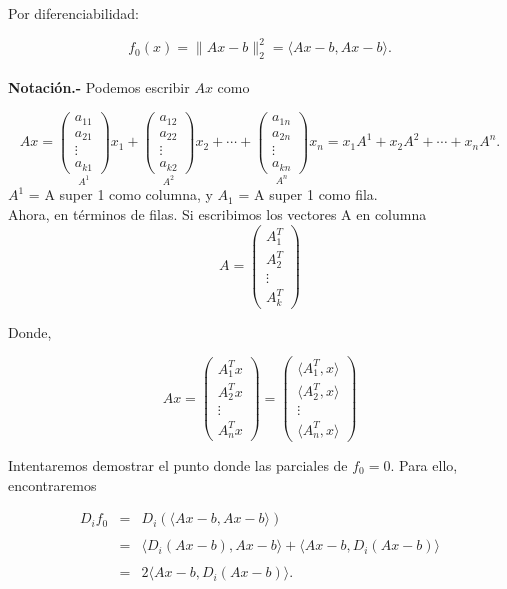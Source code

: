 \begin{ejem}
Por diferenciabilidad:

$$f_0(x)=\|Ax-b\|_2^2 = \langle Ax-b,Ax-b\rangle.$$\\


\textbf{Notación.-} Podemos escribir $Ax$ como

$$
Ax = 
\underset{A^1}{
\begin{pmatrix}
    a_{11}\\
    a_{21}\\
    \vdots\\
    a_{k1}
\end{pmatrix}}
x_1+
\underset{A^2}{
\begin{pmatrix}
	a_{12}\\
	a_{22}\\
	\vdots\\
	a_{k2}
\end{pmatrix}}
x_2+
\cdots +
\underset{A^n}{
\begin{pmatrix}
	a_{1n}\\
	a_{2n}\\
	\vdots\\
	a_{kn}
\end{pmatrix}}
x_n
=
x_1A^1+x_2A^2+\cdots+x_nA^n.
$$
$A^1$ = A super 1 como columna, y $A_1$ = A super 1 como fila.\\

Ahora, en términos de filas. Si escribimos los vectores A en columna
$$
A = 
\begin{pmatrix}
	A^T_1\\
	A^T_2\\
	\vdots\\
	A^T_k
\end{pmatrix}
$$

Donde,

$$
Ax = 
\begin{pmatrix}
	A^T_1x\\
	A^T_2x\\
	\vdots\\
	A^T_nx
\end{pmatrix}
=
\begin{pmatrix}
	\langle A^T_1,x\rangle\\
	\langle A^T_2,x\rangle\\
	\vdots\\
	\langle A^T_n,x\rangle
\end{pmatrix}
$$


Intentaremos demostrar el punto donde las parciales de $f_0=0$. Para ello, encontraremos 

$$
\begin{array}{rcl}
    D_if_0&=&D_i\left(\langle Ax-b, Ax-b\rangle\right)\\\\
	  &=&\langle D_i\left(Ax-b\right),Ax-b\rangle+\langle Ax-b,D_i\left(Ax-b\right)\rangle\\\\
	  &=& 2\langle Ax-b,D_i\left(Ax-b\right)\rangle.
\end{array}
$$


\end{ejem}
